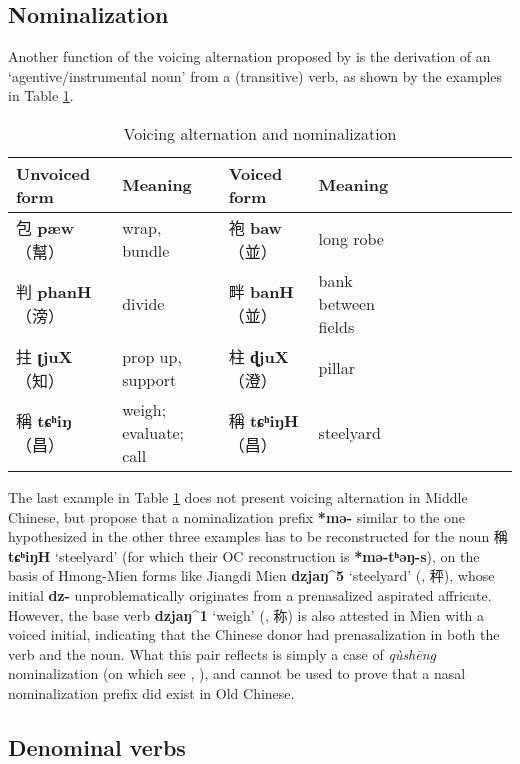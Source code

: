 \documentclass[oneside,a4paper,11pt]{article}
\newcommand{\ipa}[1]{\textbf{{\phon\mbox{#1}}}} %
\newcommand{\zh}[1]{{\cn #1}}
\newcommand{\zhc}[2]{\zh{#1} \ipa{#2}}
\newcommand{\mc}[1]{\zh{（#1）}}
\begin{document}
\citet[282-4]{wangyt14jingdian}
\subsection{Nominalization}
Another function of the voicing alternation proposed by \citet[55]{bs14oc} is the derivation of an `agentive/instrumental noun' from a (transitive) verb, as shown by the examples in Table \ref{tab:nmlz.voicing.oc}.


\begin{table}[H]
\caption{Voicing alternation and nominalization} \label{tab:nmlz.voicing.oc}
\begin{tabular}{llllllllll}
\toprule
Unvoiced form &Meaning & Voiced form & Meaning\\
\midrule
\zhc{包}{pæw} \mc{幫}	&wrap, bundle & \zhc{袍}{baw} \mc{並} & long robe \\
\zhc{判}{phanH} \mc{滂}	&divide & \zhc{畔}{banH} \mc{並} & bank between fields \\
\zhc{拄}{ʈjuX} \mc{知}	&prop up, support  & \zhc{柱}{ɖjuX} \mc{澄} & pillar \\
\zhc{稱}{tɕʰiŋ} \mc{昌}	&weigh; evaluate; call & \zhc{稱}{tɕʰiŋH} \mc{昌} & steelyard \\
\bottomrule
\end{tabular}
\end{table}

The last example in Table \ref{tab:nmlz.voicing.oc} does not present voicing alternation in Middle Chinese, but \citet{bs14oc} propose that a nominalization prefix \ipa{*mə-} similar to the one hypothesized in the other three examples has to be reconstructed for the noun \zhc{稱}{tɕʰiŋH} `steelyard' (for which their OC reconstruction is \ipa{*mə-tʰəŋ-s}), on the basis of Hmong-Mien forms like Jiangdi Mien \ipa{dzjaŋ^5} `steelyard' (\citealt[68]{maozw92mien}, \zh{秤}), whose initial \ipa{dz-} unproblematically originates from a prenasalized aspirated affricate. However, the base verb \ipa{dzjaŋ^1} `weigh' (\citet[167]{maozw92mien}, \zh{称}) is also attested in Mien with a voiced initial, indicating that the Chinese donor had prenasalization in both the verb and the noun. What this pair reflects is simply a case of \textit{qùshēng} nominalization (on which see \citealt{downer59}, \citealt{jacques16ssuffixes}), and cannot be used to prove that a nasal nominalization prefix did exist in Old Chinese.


\subsection{Denominal verbs}
\citet[55]{bs14oc}
\end{document}
